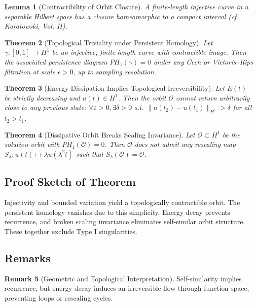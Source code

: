 \documentclass[11pt]{article}
\newtheorem{theorem}{Theorem}[section]
\newtheorem{lemma}[theorem]{Lemma}
\theoremstyle{definition}
\newtheorem{remark}[theorem]{Remark}
\begin{document}
\begin{lemma}[Contractibility of Orbit Closure]
A finite-length injective curve in a separable Hilbert space has a closure homeomorphic to a compact interval (cf. Kuratowski, Vol. II).
\end{lemma}

\begin{theorem}[Topological Triviality under Persistent Homology]
Let \( \gamma: [0,1] \to H^1 \) be an injective, finite-length curve with contractible image. Then the associated persistence diagram \( PH_1(\gamma) = 0 \) under any \v{C}ech or Vietoris--Rips filtration at scale \( \epsilon > 0 \), up to sampling resolution.
\end{theorem}

\begin{theorem}[Energy Dissipation Implies Topological Irreversibility]
Let \( E(t) \) be strictly decreasing and \( u(t) \in H^1 \). Then the orbit \( \mathcal{O} \) cannot return arbitrarily close to any previous state: \( \forall \varepsilon > 0, \exists \delta > 0 \) s.t. \( \|u(t_2) - u(t_1)\|_{H^1} > \delta \) for all \( t_2 > t_1 \).
\end{theorem}

\begin{theorem}[Dissipative Orbit Breaks Scaling Invariance]
Let \( \mathcal{O} \subset H^1 \) be the solution orbit with \( PH_1(\mathcal{O}) = 0 \). Then \( \mathcal{O} \) does not admit any rescaling map \( S_\lambda: u(t) \mapsto \lambda u(\lambda^2 t) \) such that \( S_\lambda(\mathcal{O}) = \mathcal{O} \).
\end{theorem}

\subsection*{Proof Sketch of Theorem}
Injectivity and bounded variation yield a topologically contractible orbit. The persistent homology vanishes due to this simplicity. Energy decay prevents recurrence, and broken scaling invariance eliminates self-similar orbit structure. These together exclude Type I singularities.

\subsection*{Remarks}
\begin{remark}[Geometric and Topological Interpretation]
Self-similarity implies recurrence, but energy decay induces an irreversible flow through function space, preventing loops or rescaling cycles.
\end{remark}
\end{document}
